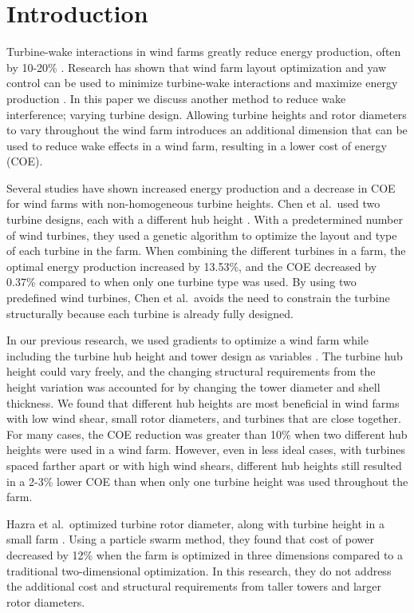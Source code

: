 \documentclass[conf]{new-aiaa}
\begin{document}
\section{Introduction}

Turbine-wake interactions in wind farms greatly reduce energy production, often by 10-20\% \cite{wakeLoss1,wakeLoss2}. Research has shown that wind farm layout optimization and yaw control can be used to minimize turbine-wake interactions and maximize energy production \cite{wagner2011optimizing,Fleming2015-Wind-Plant,Gebraad2015-Maximization-Annual}. In this paper we discuss another method to reduce wake interference; varying turbine design. Allowing turbine heights and rotor diameters to vary throughout the wind farm introduces an additional dimension that can be used to reduce wake effects in a wind farm, resulting in a lower cost of energy (COE).

Several studies have shown increased energy production and a decrease in COE for wind farms with non-homogeneous turbine heights. Chen et al.\ used two turbine designs, each with a different hub height  \cite{chen2013wind}. With a predetermined number of wind turbines, they used a genetic algorithm to optimize the layout and type of each turbine in the farm. When combining the different turbines in a farm, the optimal energy production increased by 13.53\%, and the COE decreased by 0.37\% compared to when only one turbine type was used. By using two predefined wind turbines, Chen et al.\ avoids the need to constrain the turbine structurally because each turbine is already fully designed.

In our previous research, we used gradients to optimize a wind farm while including the turbine hub height and tower design as variables  \cite{Stanley2017_WE}. The turbine hub height could vary freely, and the changing structural requirements from the height variation was accounted for by changing the tower diameter and shell thickness. We found that different hub heights are most beneficial in wind farms with low wind shear, small rotor diameters, and turbines that are close together. For many cases, the COE reduction was greater than 10\% when two different hub heights were used in a wind farm. However, even in less ideal cases, with turbines spaced farther apart or with high wind shears, different hub heights still resulted in a 2-3\% lower COE than when only one turbine height was used throughout the farm.

Hazra et al.\ optimized turbine rotor diameter, along with turbine height in a small farm \cite{HazraMMZ15}. Using a particle swarm method, they found that cost of power decreased by 12\% when the farm is optimized in three dimensions compared to a traditional two-dimensional optimization. In this research, they do not address the additional cost and structural requirements from taller towers and larger rotor diameters.
\end{document}
